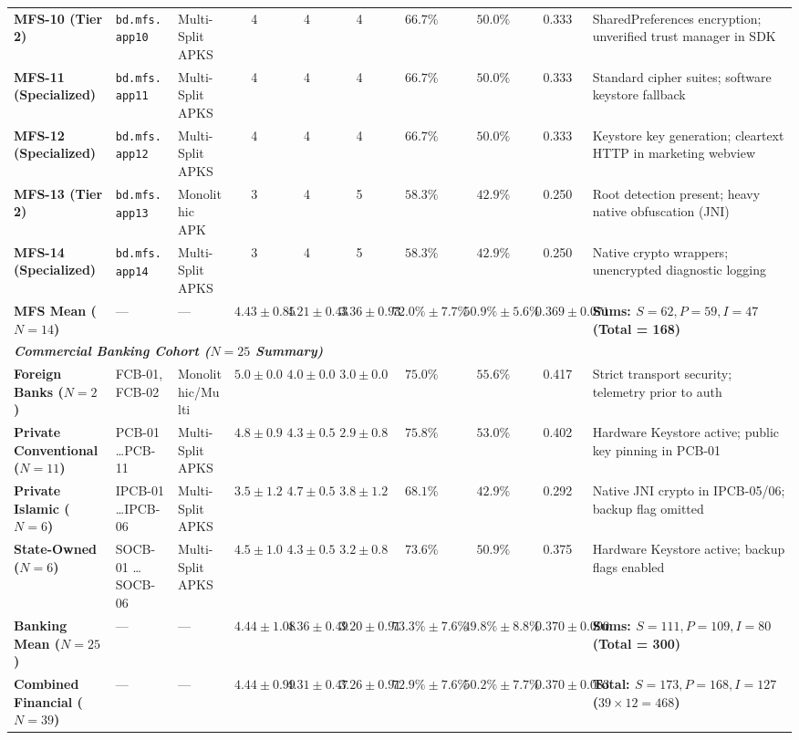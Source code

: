 \begin{table}[t]
{\begin{tabular}{lllccccccl}
\textbf{MFS-10 (Tier 2)} & \texttt{bd.mfs.app10} & Multi-Split APKS & 4 & 4 & 4 & $66.7\%$ & $50.0\%$ & 0.333 & SharedPreferences encryption; unverified trust manager in SDK \\
\textbf{MFS-11 (Specialized)} & \texttt{bd.mfs.app11} & Multi-Split APKS & 4 & 4 & 4 & $66.7\%$ & $50.0\%$ & 0.333 & Standard cipher suites; software keystore fallback \\
\textbf{MFS-12 (Specialized)} & \texttt{bd.mfs.app12} & Multi-Split APKS & 4 & 4 & 4 & $66.7\%$ & $50.0\%$ & 0.333 & Keystore key generation; cleartext HTTP in marketing webview \\
\textbf{MFS-13 (Tier 2)} & \texttt{bd.mfs.app13} & Monolithic APK & 3 & 4 & 5 & $58.3\%$ & $42.9\%$ & 0.250 & Root detection present; heavy native obfuscation (JNI) \\
\textbf{MFS-14 (Specialized)} & \texttt{bd.mfs.app14} & Multi-Split APKS & 3 & 4 & 5 & $58.3\%$ & $42.9\%$ & 0.250 & Native crypto wrappers; unencrypted diagnostic logging \\
\midrule
\textbf{MFS Mean ($N=14$)} & --- & --- & $\mathbf{4.43 \pm 0.85}$ & $\mathbf{4.21 \pm 0.43}$ & $\mathbf{3.36 \pm 0.93}$ & $\mathbf{72.0\% \pm 7.7\%}$ & $\mathbf{50.9\% \pm 5.6\%}$ & $\mathbf{0.369 \pm 0.071}$ & \textbf{Sums: $S=62, P=59, I=47$ (Total = 168)} \\
\midrule
\multicolumn{10}{l}{\textit{\textbf{Commercial Banking Cohort ($N = 25$ Summary)}}} \\
\textbf{Foreign Banks ($N=2$)} & FCB-01, FCB-02 & Monolithic/Multi & $5.0 \pm 0.0$ & $4.0 \pm 0.0$ & $3.0 \pm 0.0$ & $75.0\%$ & $55.6\%$ & 0.417 & Strict transport security; telemetry prior to auth \\
\textbf{Private Conventional ($N=11$)} & PCB-01 \dots PCB-11 & Multi-Split APKS & $4.8 \pm 0.9$ & $4.3 \pm 0.5$ & $2.9 \pm 0.8$ & $75.8\%$ & $53.0\%$ & 0.402 & Hardware Keystore active; public key pinning in PCB-01 \\
\textbf{Private Islamic ($N=6$)} & IPCB-01 \dots IPCB-06 & Multi-Split APKS & $3.5 \pm 1.2$ & $4.7 \pm 0.5$ & $3.8 \pm 1.2$ & $68.1\%$ & $42.9\%$ & 0.292 & Native JNI crypto in IPCB-05/06; backup flag omitted \\
\textbf{State-Owned ($N=6$)} & SOCB-01 \dots SOCB-06 & Multi-Split APKS & $4.5 \pm 1.0$ & $4.3 \pm 0.5$ & $3.2 \pm 0.8$ & $73.6\%$ & $50.9\%$ & 0.375 & Hardware Keystore active; backup flags enabled \\
\midrule
\textbf{Banking Mean ($N=25$)} & --- & --- & $\mathbf{4.44 \pm 1.08}$ & $\mathbf{4.36 \pm 0.49}$ & $\mathbf{3.20 \pm 0.91}$ & $\mathbf{73.3\% \pm 7.6\%}$ & $\mathbf{49.8\% \pm 8.8\%}$ & $\mathbf{0.370 \pm 0.090}$ & \textbf{Sums: $S=111, P=109, I=80$ (Total = 300)} \\
\midrule
\textbf{Combined Financial ($N=39$)} & --- & --- & $\mathbf{4.44 \pm 0.99}$ & $\mathbf{4.31 \pm 0.47}$ & $\mathbf{3.26 \pm 0.91}$ & $\mathbf{72.9\% \pm 7.6\%}$ & $\mathbf{50.2\% \pm 7.7\%}$ & $\mathbf{0.370 \pm 0.083}$ & \textbf{Total: $S=173, P=168, I=127$ ($39 \times 12 = 468$)} \\
\bottomrule
\end{tabular}%
}
\end{table}

